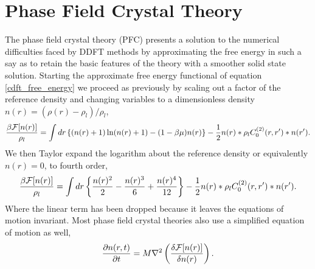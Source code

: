 \section{Phase Field Crystal Theory} %

The phase field crystal theory (PFC) presents a solution to the numerical difficulties
faced by DDFT methods by approximating the free energy in such a say as to retain the
basic features of the theory with a smoother solid state solution. Starting the 
approximate free energy functional of equation \ref{cdft_free_energy} we proceed as
previously by scaling out a factor of the reference density and changing variables
to a dimensionless density $n(r) = (\rho(r) - \rho_l) / \rho_l$,
%
\begin{equation}
    \frac{\beta \mathcal{F}[n(r)]}{\rho_l} = 
        \int dr \left\lbrace (n(r) + 1) \ln( n(r) + 1) - (1 - \beta\mu)n(r) \right\rbrace
        - \frac{1}{2} n(r) \ast \rho_l C^{(2)}_0(r, r^\prime) \ast n(r^\prime).
\end{equation}
%
We then Taylor expand the logarithm about the reference density or equivalently
$n(r) = 0$, to fourth order,
%
\begin{equation}
    \label{pfc_free_energy} 
    \frac{\beta \mathcal{F}[n(r)]}{\rho_l} =
        \int dr \left\lbrace \frac{n(r)^2}{2} - \frac{n(r)^3}{6} + \frac{n(r)^4}{12} \right\rbrace
        -\frac{1}{2} n(r) \ast \rho_l C^{(2)}_0(r, r^\prime) \ast n(r^\prime).
\end{equation}
%
Where the linear term has been dropped because it leaves the equations of
motion invariant.  Most phase field crystal theories also use a simplified
equation of motion as well,
%
\begin{equation}
    \label{pfc_eom}
    \frac{\partial n(r, t)}{\partial t} = M \nabla^2 \left(\frac{\delta \mathcal{F}[n(r)]}{\delta n(r)}\right).
\end{equation}
%

